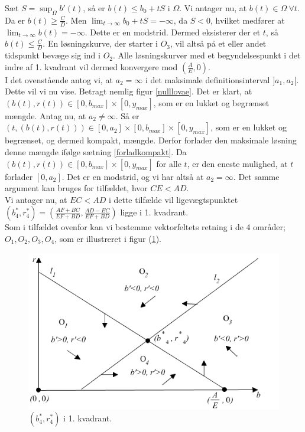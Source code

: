 Sæt $S=\sup_{\Omega} b'(t)$, så er $b(t) \leq b_0 +tS$ i $\Omega$. Vi antager nu, at $b(t) \in \Omega  \ \forall t$. Da er $b(t) \geq \frac{C}{D}$. Men $\lim_{t \to \infty} b_0+tS= -\infty$, da $S<0$, hvilket medfører at $\lim_{t \to \infty} b(t)= -\infty$. Dette er en modstrid. Dermed eksisterer der et $t$, så $b(t)\leq \frac{C}{D}$. En løsningskurve, der starter i $O_3$, vil altså på et eller andet tidspunkt bevæge sig ind i $O_2$. Alle løsningskurver med et begyndelsespunkt i det indre af 1. kvadrant vil dermed konvergere mod $(\frac{A}{E},0)$.\\ 
\hfill \break 
I det ovenstående antog vi, at $a_2=\infty$ i det maksimale definitionsinterval $]a_1,a_2[$. Dette vil vi nu vise. Betragt nemlig figur \ref{nulllovae}. Det er klart, at $(b(t),r(t))\in [0,b_{max}]\times[0,y_{max}]$, som er en lukket og begrænset mængde. Antag nu, at $a_2\neq\infty$. Så er $(t,(b(t),r(t)))\in [0,a_2]\times[0,b_{max}]\times[0,y_{max}]$, som er en lukket og begrænset, og dermed kompakt, mængde. Derfor forlader den maksimale løsning denne mængde ifølge sætning \ref{forladkompakt}. Da $(b(t),r(t))\in [0,b_{max}]\times[0,y_{max}]$ for alle $t$, er den eneste mulighed, at $t$ forlader $[0,a_2]$. Det er en modstrid, og vi har altså at $a_2=\infty$. Det samme argument kan bruges for tilfældet, hvor $CE<AD$.
\\ \hfill \break
Vi antager nu, at $EC<AD$ i dette tilfælde vil ligevægtspunktet $(b_4^*,r_4^*)= \left(\frac{AF+BC}{EF+BD},\frac{AD-EC}{EF+BD}\right)$ ligge i 1. kvadrant. \\ \hfill \break
Som i tilfældet ovenfor kan vi bestemme vektorfeltets retning i de 4 områder; $O_1,O_2,O_3,O_4$, som er illustreret i figur (\ref{nulllovae2}).

\begin{figure} [H]
    \centering
    \includegraphics[scale=0.8]{Images/LoVae2.png}
    \caption{$(b_4^*,r_4^*)$ i 1. kvadrant.}
    \label{nulllovae2}
\end{figure}

